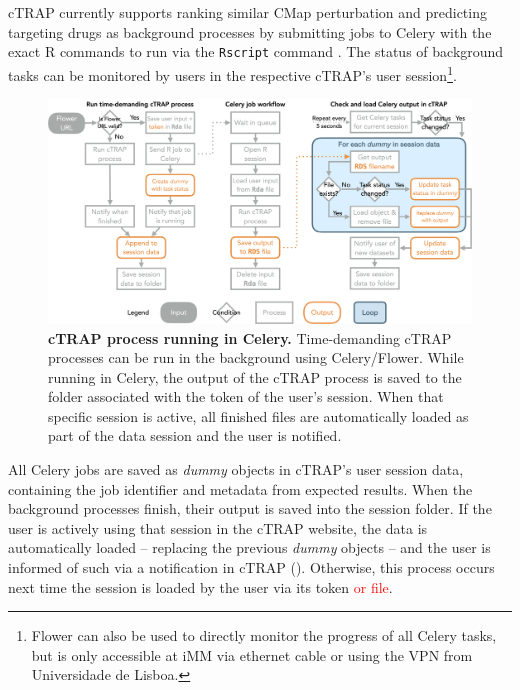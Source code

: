 cTRAP currently supports ranking similar CMap perturbation and predicting targeting drugs as background processes by submitting jobs to Celery with the exact R commands to run via the \texttt{Rscript} command \cite{r-core-team:2021wf}. The status of background tasks can be monitored by users in the respective cTRAP's user session\footnote{Flower can also be used to directly monitor the progress of all Celery tasks, but is only accessible at iMM via ethernet cable or using the VPN from Universidade de Lisboa.}.


\begin{figure}[!b]
  \includegraphics[width=\textwidth]{images/ctrap/celery-job}
  \centering
  \caption[cTRAP process running in Celery]{\textbf{cTRAP process running in Celery.} Time-demanding cTRAP processes can be run in the background using Celery/Flower. While running in Celery, the output of the cTRAP process is saved to the folder associated with the token of the user's session. When that specific session is active, all finished files are automatically loaded as part of the data session and the user is notified.}
  \label{fig:ctrap-celery}
\end{figure}

All Celery jobs are saved as \emph{dummy} objects in cTRAP's user session data, containing the job identifier and metadata from expected results. When the background processes finish, their output is saved into the session folder. If the user is actively using that session in the cTRAP website, the data is automatically loaded -- replacing the previous \emph{dummy} objects -- and the user is informed of such via a notification in cTRAP (). Otherwise, this process occurs next time the session is loaded by the user via its token \textcolor{red}{or file}.

